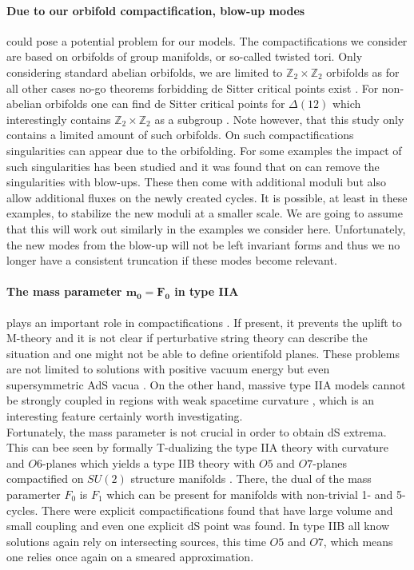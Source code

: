 \documentclass[12pt]{report}
\begin{document}
\paragraph{Due to our orbifold compactification, blow-up modes} could pose a potential problem for our models. The compactifications we consider are based on orbifolds of group manifolds, or so-called twisted tori. Only considering standard abelian orbifolds, we are limited to $\mathbb{Z}_2 \times \mathbb{Z}_2$ orbifolds as for all other cases no-go theorems forbidding de Sitter critical points exist \cite{Flauger:2008ad}. For non-abelian orbifolds one can find de Sitter critical points for $\Delta(12)$ which interestingly contains $\mathbb{Z}_2 \times \mathbb{Z}_2$ as a subgroup \cite{Danielsson:2011au}. Note however, that this study only contains a limited amount of such orbifolds. On such compactifications singularities can appear due to the orbifolding. For some examples the impact of such singularities has been studied \cite{DeWolfe:2005uu,Ihl:2006pp} and it was found that on can remove the singularities with blow-ups. These then come with additional moduli but also allow additional fluxes on the newly created cycles. It is possible, at least in these examples, to stabilize the new moduli at a smaller scale. We are going to assume that this will work out similarly in the examples we consider here. Unfortunately, the new modes from the blow-up will not be left invariant forms and thus we no longer have a consistent truncation if these modes become relevant.
\paragraph{The mass parameter $\mathbf{m_0 = F_0}$ in type IIA} plays an important role in compactifications \cite{Romans:1985tz}. If present, it prevents the uplift to M-theory and it is not clear if perturbative string theory can describe the situation and one might not be able to define orientifold planes. These problems are not limited to solutions with positive vacuum energy but even supersymmetric AdS vacua \cite{Banks:2006hg}. On the other hand, massive type IIA models cannot be strongly coupled in regions with weak spacetime curvature \cite{Aharony:2010af}, which is an interesting feature certainly worth investigating.\\
Fortunately, the mass parameter is not crucial in order to obtain dS extrema. This can bee seen by formally T-dualizing the type IIA theory with curvature and $O6$-planes which yields a type IIB theory with $O5$ and $O7$-planes compactified on $SU(2)$ structure manifolds \cite{Caviezel:2009tu}. There, the dual of the mass paramerter $F_0$ is $F_1$ which can be present for manifolds with non-trivial 1- and 5-cycles. There were explicit compactifications found that have large volume and small coupling and even one explicit dS point was found. In type IIB all know solutions again rely on intersecting sources, this time $O5$ and $O7$, which means one relies once again on a smeared approximation.
\end{document}
